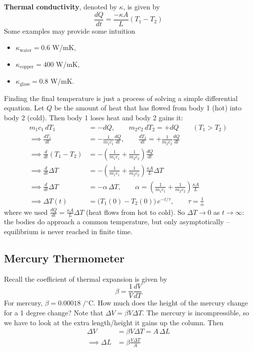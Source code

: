 \documentclass{report}
\numberwithin{equation}{section}
\begin{document}
\noindent\textbf{Thermal conductivity}, denoted by $\kappa$, is given by
\begin{equation}
    \frac{dQ}{dt} = \frac{-\kappa A}{L}(T_1- T_2)
\end{equation}
Some examples may provide some intuition
\begin{itemize}
    \item  $\kappa_{\text{water}} = 0.6$ W/mK,
    \item $\kappa_{\text{copper}} =  400$ W/mK,
    \item $\kappa_{\text{glass}} = 0.8$ W/mK.
\end{itemize}
Finding the final temperature is just a process of solving a simple differential equation. Let $Q$ be the amount of heat that has flowed from body 1 (hot) into body 2 (cold). Then body 1 loses heat and body 2 gains it:
\begin{align*}
    m_1c_1\, dT_1 &= - dQ, \qquad m_2c_2\, dT_2 = + dQ \qquad (T_1>T_2)\\
    \implies \frac{dT_1}{dt} &= -\frac{1}{m_1c_1}\frac{dQ}{dt}, \qquad \frac{dT_2}{dt} = +\frac{1}{m_2c_2}\frac{dQ}{dt}\\
    \implies \frac{d}{dt} (T_1-T_2) &= -\left(\frac{1}{m_1c_1}+ \frac{1}{m_2c_2}\right)\frac{dQ}{dt}\\
    \implies \frac{d}{dt} \Delta T &= -\left(\frac{1}{m_1c_1} + \frac{1}{m_2c_2}\right)\frac{\kappa A}{L}\Delta T\\
    \implies \frac{d}{dt}\Delta T &= -\alpha\, \Delta T,\qquad \alpha = \left(\frac{1}{m_1c_1} + \frac{1}{m_2c_2}\right)\frac{\kappa A}{L}\\
    \implies \Delta T(t) &= \big(T_1(0) - T_2(0)\big)\,e^{-t/\tau},\qquad \tau = \frac{1}{\alpha}
\end{align*}
where we used $\frac{dQ}{dt} = \frac{\kappa A}{L}\Delta T$ (heat flows from hot to cold). So $\Delta T \to 0$ as $t\to\infty$: the bodies do approach a common temperature, but only asymptotically -- equilibrium is never reached in finite time.
\subsection{Mercury Thermometer}
Recall the coefficient of thermal expansion is given by
\begin{equation*}
    \beta = \frac{1}{V}\frac{dV}{dT}
\end{equation*}
For mercury, $\beta = 0.00018\;/{}^{\circ}$C. How much does the height of the mercury change for a 1 degree change? Note that $\Delta V = \beta V \Delta T$. The mercury is incompressible, so we have to look at the
extra length/height it gains up the column. Then
\begin{align*}
    \Delta V &= \beta V \Delta T = A\,\Delta L\\
    \implies \Delta L &= \beta\frac{V\Delta T}{A}
\end{align*}
\end{document}
